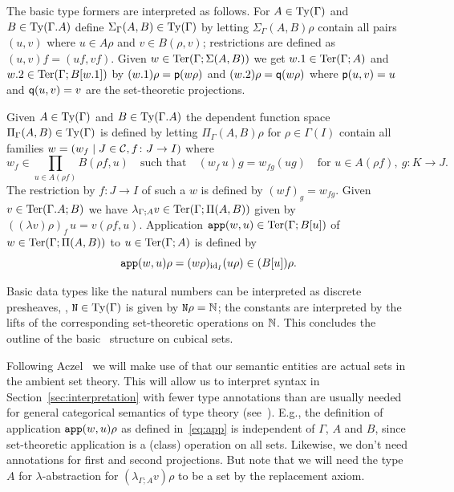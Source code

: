 The basic type formers are interpreted as follows.  For $A \in \operatorname{Ty}
(\Gamma)$ and $B \in \operatorname{Ty} (\Gamma.A)$ define $\Sigma_\Gamma (A,B) \in
\operatorname{Ty} (\Gamma)$ by letting $\Sigma_\Gamma (A,B) \rho$ contain all pairs
$(u,v)$ where $u \in A \rho$ and $v \in B (\rho,v)$; restrictions are
defined as $(u,v) f = (uf, vf)$.  Given $w \in \operatorname{Ter}
(\Gamma;\Sigma(A,B))$ we get $w.1 \in \operatorname{Ter} (\Gamma;A)$ and $w.2 \in
\operatorname{Ter}(\Gamma;B[w.1])$ by $(w.1) \rho = {\sf p} (w \rho)$ and $(w.2) \rho =
{\sf q} (w \rho)$ where ${\sf p} (u,v) = u$ and ${\sf q} (u,v) = v$ are the
set-theoretic projections.

Given $A \in \operatorname{Ty} (\Gamma)$ and $B \in \operatorname{Ty} (\Gamma.A)$ the dependent
function space $\Pi_\Gamma (A,B) \in \operatorname{Ty}(\Gamma)$ is defined by
letting $\Pi_\Gamma (A,B) \rho$ for $\rho \in \Gamma (I)$ contain all
families $w = (w_f \mid J \in \mathcal{C}, f \colon J \to I)$ where
%
\[
w_f \in \prod_{u \in A (\rho f)} B (\rho f, u) \quad \text{such that}
\quad (w_f \, u) g = w_{fg} (u g) \quad \text{for } u \in A (\rho
f),~g\colon K\to J.
\]
The restriction by $f \colon J \to I$ of such a $w$ is defined by $(w
f)_g = w_{fg}$.  Given $v \in \operatorname{Ter} (\Gamma.A;B)$ we have
$\lambda_{\Gamma; A} v \in \operatorname{Ter} (\Gamma;\Pi (A,B))$ given by
$((\lambda v) \rho)_f \, u = v (\rho f, u)$.  Application $\operatorname{\mathtt{app}}(w,u) \in
\operatorname{Ter} (\Gamma;B[u])$ of $w \in \operatorname{Ter}(\Gamma;\Pi (A,B))$ to $u \in
\operatorname{Ter}(\Gamma;A)$ is defined by
\begin{equation}
  \label{eq:app}
  \operatorname{\mathtt{app}}(w,u) \rho = (w \rho)_{\mathrm{id}_I} (u \rho) \in (B [u]) \rho.
\end{equation}

Basic data types like the natural numbers can be interpreted as
discrete presheaves, \ie{}, $\mathtt{N} \in \operatorname{Ty} (\Gamma)$ is given by $\mathtt{N}
\rho = \mathbb{N}$; the constants are interpreted by the lifts of the
corresponding set-theoretic operations on $\mathbb{N}$.  This concludes the
outline of the basic \cwf\ structure on cubical sets.

\begin{remark*}
  Following Aczel~\cite{Aczel99} we will make use of that our semantic
  entities are actual sets in the ambient set theory.  This will allow
  us to interpret syntax in Section~\ref{sec:interpretation} with
  fewer type annotations than are usually needed for general
  categorical semantics of type theory
  (see~\cite{Streicher91}). E.g., the definition of application
  $\operatorname{\mathtt{app}} (w,u) \rho$ as defined in~\eqref{eq:app} is independent of
  $\Gamma$, $A$ and $B$, since set-theoretic application is a (class)
  operation on all sets.  Likewise, we don't need annotations for
  first and second projections.  But note that we will need the type
  $A$ for $\lambda$-abstraction for $(\lambda_{\Gamma;A} v) \rho$ to
  be a set by the replacement axiom.
\end{remark*}


